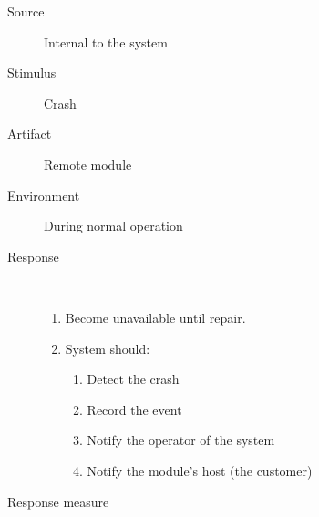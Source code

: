 \begin{description}
	\item[Source] Internal to the system
	\item[Stimulus] Crash
	\item[Artifact] Remote module 
	\item[Environment] During normal operation 
	\item[Response] \
	\begin{enumerate}
	  \item Become unavailable until repair.  
	  \item System should:
	  \begin{enumerate}
	  	\item Detect the crash
	  	\item Record the event
	  	\item Notify the operator of the system
	  	\item Notify the module's host (the customer)
	  \end{enumerate}
	\end{enumerate}
	\item[Response measure] \ %
\end{description}